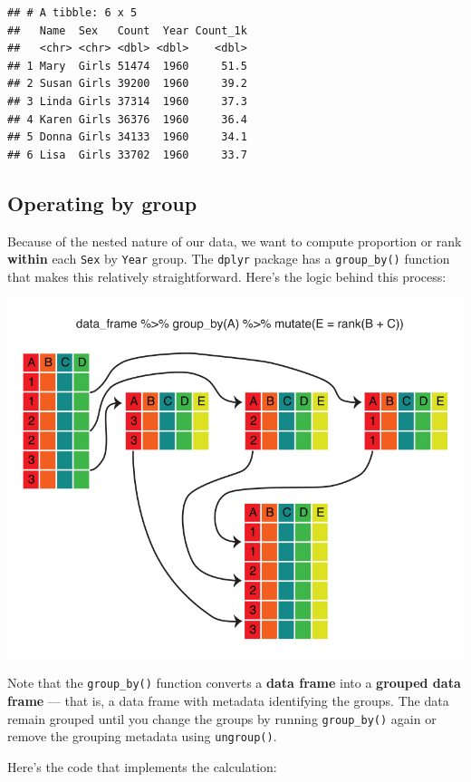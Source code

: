 \documentclass[
]{book}
\begin{document}
\begin{verbatim}
## # A tibble: 6 x 5
##   Name  Sex   Count  Year Count_1k
##   <chr> <chr> <dbl> <dbl>    <dbl>
## 1 Mary  Girls 51474  1960     51.5
## 2 Susan Girls 39200  1960     39.2
## 3 Linda Girls 37314  1960     37.3
## 4 Karen Girls 36376  1960     36.4
## 5 Donna Girls 34133  1960     34.1
## 6 Lisa  Girls 33702  1960     33.7
\end{verbatim}

\hypertarget{operating-by-group}{%
\subsection{Operating by group}\label{operating-by-group}}

Because of the nested nature of our data, we want to compute proportion or rank \textbf{within} each \texttt{Sex} by \texttt{Year} group. The \texttt{dplyr} package has a \texttt{group\_by()} function that makes this relatively straightforward. Here's the logic behind this process:

\includegraphics{R/Rintro/images/mutate_group_by.png}

Note that the \texttt{group\_by()} function converts a \textbf{data frame} into a \textbf{grouped data frame} --- that is, a data frame with metadata identifying the groups. The data remain grouped until you change the groups by running \texttt{group\_by()} again or remove the grouping metadata using \texttt{ungroup()}.

Here's the code that implements the calculation:
\end{document}
